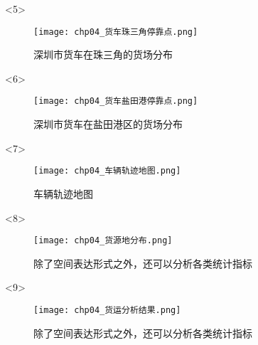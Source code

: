 \begin{frame}[t]{\subsecname}
\begin{overlayarea}{\textwidth}{\textheight}
  \begin{onlyenv}<5>
\begin{figure}
  \centering
  \texttt{[image: chp04\_货车珠三角停靠点.png]}
  \caption{深圳市货车在珠三角的货场分布}
\end{figure}
  \end{onlyenv}

  \begin{onlyenv}<6>
\begin{figure}
  \centering
  \texttt{[image: chp04\_货车盐田港停靠点.png]}
  \caption{深圳市货车在盐田港区的货场分布}
\end{figure}
  \end{onlyenv}

  \begin{onlyenv}<7>
\begin{figure}
  \centering
  \texttt{[image: chp04\_车辆轨迹地图.png]}
  \caption{车辆轨迹地图}
\end{figure}
  \end{onlyenv}

  \begin{onlyenv}<8>
\begin{figure}
  \centering
  \texttt{[image: chp04\_货源地分布.png]}
  \caption{除了空间表达形式之外，还可以分析各类统计指标}
\end{figure}
  \end{onlyenv}

  \begin{onlyenv}<9>
\begin{figure}
  \centering
  \texttt{[image: chp04\_货运分析结果.png]}
  \caption{除了空间表达形式之外，还可以分析各类统计指标}
\end{figure}
  \end{onlyenv}
\end{overlayarea}
\end{frame}



